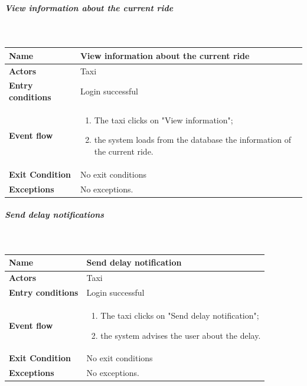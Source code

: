\subparagraph{View information about the current ride}
~\\[0.2cm]
\vspace{20pt}
\noindent
\begin{tabular}{l l}
 \textbf {Name} & View information about the current ride  \\ \hline
 \textbf{Actors} & Taxi \\ \hline
 \textbf{Entry conditions} & Login successful \\ \hline
 \textbf{Event flow} & 
 \parbox{0.7\textwidth}{
 \begin{enumerate}
 \item The taxi clicks on "View information";
 \item the system loads from the database the information of the current ride.
 \end{enumerate}
 } \\ \hline
 \textbf{Exit Condition} & No exit conditions \\ \hline
 \textbf{Exceptions} & No exceptions.
\end{tabular}

\newpage
\subparagraph{Send delay notifications}
~\\[0.2cm]
\vspace{20pt}
\noindent
\begin{tabular}{l l}
 \textbf {Name} & Send delay notification  \\ \hline
 \textbf{Actors} & Taxi \\ \hline
 \textbf{Entry conditions} & Login successful \\ \hline
 \textbf{Event flow} & 
 \parbox{0.7\textwidth}{
 \begin{enumerate}
 \item The taxi clicks on "Send delay notification";
 \item the system advises the user about the delay.
 \end{enumerate}
 } \\ \hline
 \textbf{Exit Condition} & No exit conditions \\ \hline
 \textbf{Exceptions} & No exceptions.
\end{tabular}

